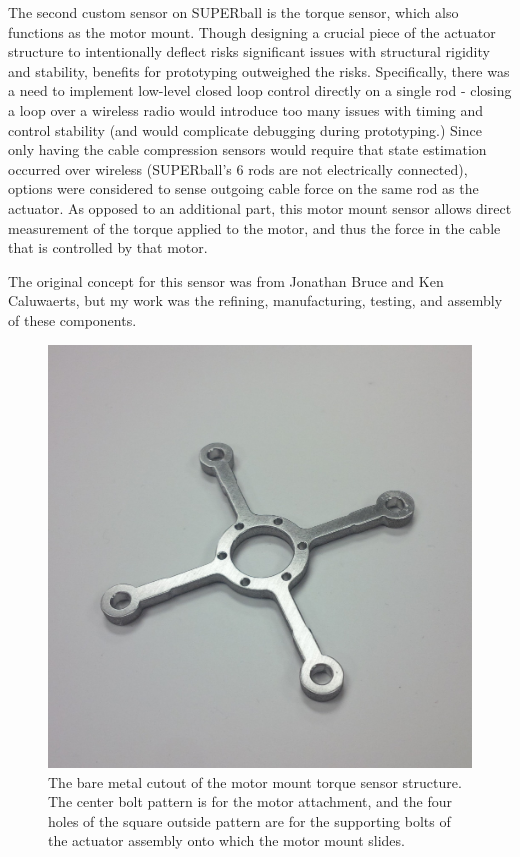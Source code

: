 \documentclass[12pt]{report}
\begin{document}
The second custom sensor on SUPERball is the torque sensor, which also functions as the motor mount.
Though designing a crucial piece of the actuator structure to intentionally deflect risks significant issues with structural rigidity and stability, benefits for prototyping outweighed the risks.
Specifically, there was a need to implement low-level closed loop control directly on a single rod - closing a loop over a wireless radio would introduce too many issues with timing and control stability (and would complicate debugging during prototyping.)
Since only having the cable compression sensors would require that state estimation occurred over wireless (SUPERball's 6 rods are not electrically connected), options were considered to sense outgoing cable force on the same rod as the actuator.
As opposed to an additional part, this motor mount sensor allows direct measurement of the torque applied to the motor, and thus the force in the cable that is controlled by that motor.

The original concept for this sensor was from Jonathan Bruce and Ken Caluwaerts, but my work was the refining, manufacturing, testing, and assembly of these components.

\begin{figure}[thpb]
      \centering
      \includegraphics[width=.5\columnwidth]{img/motor_mount_torque_sensor.jpg}
      \caption{The bare metal cutout of the motor mount torque sensor structure. The center bolt pattern is for the motor attachment, and the four holes of the square outside pattern are for the supporting bolts of the actuator assembly onto which the motor mount slides.}
      \label{fig:motor_mount_torque_sensor}
      \vspace{-0.2cm}
\end{figure}
\end{document}
